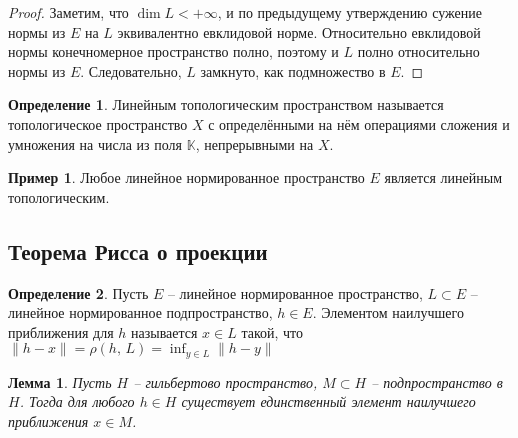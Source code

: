 \documentclass[a4paper,12pt]{article}
\theoremstyle{plain}
\newtheorem{lemma}{Лемма}[section]
\theoremstyle{definition}
\newtheorem{definition}{Определение}[section]
\newtheorem*{example}{Пример}
\theoremstyle{remark}
\begin{document}
\begin{proof}
	Заметим, что $\dim L < +\infty$, и по предыдущему утверждению сужение нормы из $E$ на $L$ эквивалентно евклидовой норме. Относительно евклидовой нормы конечномерное пространство полно, поэтому и $L$ полно относительно нормы из $E$. Следовательно, $L$ замкнуто, как подмножество в $E$.
\end{proof}

\begin{definition}
	Линейным топологическим пространством называется топологическое пространство $X$ с определёнными на нём операциями сложения и умножения на числа из поля $\mathbb{K}$, непрерывными на $X$.
\end{definition}

\begin{example}
	Любое линейное нормированное пространство $E$ является линейным топологическим.
\end{example}

\subsection{Теорема Рисса о проекции}
\begin{definition}
	Пусть $E$ -- линейное нормированное пространство, $L \subset E$ -- линейное нормированное подпространство, $h \in E$. Элементом наилучшего приближения для $h$ называется $x \in L$ такой, что $\|h - x\| = \rho(h,\, L) = \inf_{y \in L}\|h -y\|$
\end{definition}

\begin{lemma}
	Пусть $H$ -- гильбертово пространство, $M \subset H$ -- подпространство в $H$. Тогда для любого $h \in H$ существует единственный элемент наилучшего приближения $x \in M$.
\end{lemma}
\end{document}
